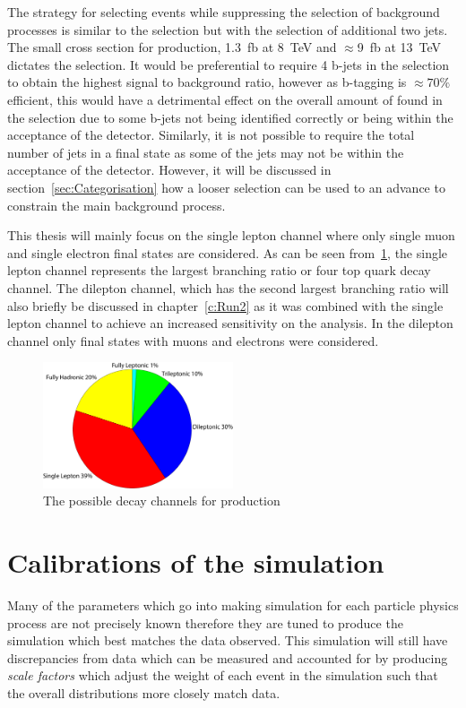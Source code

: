 The strategy for selecting \tttt events while suppressing the selection of background processes is similar to the \ttbar selection but with the selection of additional two jets. The small cross section for \tttt production, 1.3~fb at 8~TeV and $\approx$9~fb at 13~TeV dictates the selection. It would be preferential to require 4 b-jets in the selection to obtain the highest signal to background ratio, however as b-tagging is $\approx70\%$ efficient, this would have a detrimental effect on the overall amount of \tttt found in the selection due to some b-jets not being identified correctly or being within the acceptance of the detector. Similarly, it is not possible to require the total number of jets in a \tttt final state as some of the jets may not be within the acceptance of the detector. However, it will be discussed in section~\ref{sec:Categorisation} how a looser selection can be used to an advance to constrain the main background process.

This thesis will mainly focus on the single lepton channel where only single muon and single electron final states are considered. As can be seen from~\ref{fig:ttttDecay}, the single lepton channel represents the largest branching ratio or four top quark decay channel. The dilepton channel, which has the second largest branching ratio will also briefly be discussed in chapter~\ref{c:Run2} as it was combined with the single lepton channel to achieve an increased sensitivity on the analysis. In the dilepton channel only final states with muons and electrons were considered.

\begin{figure}[ht!]
\centering
    \includegraphics[width=0.5\textwidth]{images/Analysis/FourTopBR.pdf}
    \caption{The possible decay channels for \tttt production}
    \label{fig:ttttDecay}
\end{figure}




\section{Calibrations of the simulation}
\label{sec:Calibrations}
Many of the parameters which go into making simulation for each particle physics process are not precisely known therefore they are tuned to produce the simulation which best matches the data observed. This simulation will still have discrepancies from data which can be measured and accounted for by producing \emph{scale factors} which adjust the weight of each event in the simulation such that the overall distributions more closely match data. 



